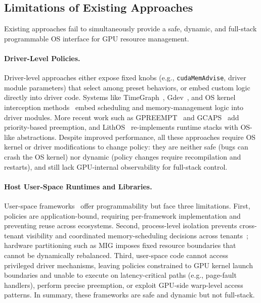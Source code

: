 \subsection{Limitations of Existing Approaches}
\label{sec:motivation-limitations}

Existing approaches fail to simultaneously provide a safe, dynamic, and full-stack programmable OS interface for GPU resource management.

\paragraph{Driver-Level Policies.}
Driver-level approaches either expose fixed knobs (e.g., \texttt{cudaMemAdvise}, driver module parameters) that select among preset behaviors, or embed custom logic directly into driver code. Systems like TimeGraph~\cite{kato2011timegraph}, Gdev~\cite{kato2012gdev}, and OS kernel interception methods~\cite{kernelintercept} embed scheduling and memory-management logic into driver modules. More recent work such as GPREEMPT~\cite{fan2025gpreempt} and GCAPS~\cite{wang2024gcaps} add priority-based preemption, and LithOS~\cite{coppock2025lithos} re-implements runtime stacks with OS-like abstractions. Despite improved performance, all these approaches require OS kernel or driver modifications to change policy: they are neither safe (bugs can crash the OS kernel) nor dynamic (policy changes require recompilation and restarts), and still lack GPU-internal observability for full-stack control.

\paragraph{Host User-Space Runtimes and Libraries.}
User-space frameworks~\cite{ng2023paella,gim2025pie,shen2025xsched,chen2025ktransformers,coppock2025lithos} offer programmability but face three limitations. First, policies are application-bound, requiring per-framework implementation and preventing reuse across ecosystems. Second, process-level isolation prevents cross-tenant visibility and coordinated memory-scheduling decisions across tenants~\cite{xiao2018gandiva,yu2020fine}; hardware partitioning such as MIG imposes fixed resource boundaries that cannot be dynamically rebalanced. Third, user-space code cannot access privileged driver mechanisms, leaving policies constrained to GPU kernel launch boundaries and unable to execute on latency-critical paths (e.g., page-fault handlers), perform precise preemption, or exploit GPU-side warp-level access patterns. In summary, these frameworks are safe and dynamic but not full-stack.

